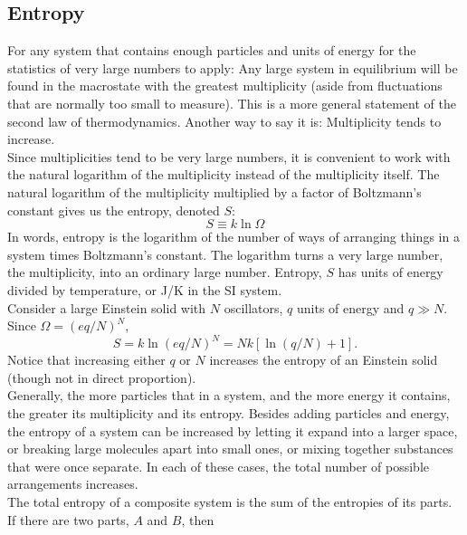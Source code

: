 \documentclass[11pt]{exam}
\begin{document}
\subsection{Entropy}
For any system that contains enough particles and units of energy for the statistics of very large numbers to apply: Any large system in equilibrium will be found in the macrostate with the greatest multiplicity (aside from fluctuations that are normally too small to measure). This is a more general statement of the second law of thermodynamics. Another way to say it is: Multiplicity tends to increase.\\
\hspace*{10mm}Since multiplicities tend to be very large numbers, it is convenient to work with the natural logarithm of the multiplicity instead of the multiplicity itself. The natural logarithm of the multiplicity multiplied by a factor of Boltzmann's constant gives us the entropy, denoted $S$:\
\begin{equation}\tag{2.45}
    S\equiv k\ln{\Omega}
\end{equation}
In words, entropy is the logarithm of the number of ways of arranging things in a system times Boltzmann's constant. The logarithm turns a very large number, the multiplicity, into an ordinary large number. Entropy, $S$ has units of energy divided by temperature, or J/K in the SI system.\\
\hspace*{10mm}Consider a large Einstein solid with $N$ oscillators, $q$ units of energy and $q\gg N$. Since $\Omega =(eq/N)^N$, 
\begin{equation}\tag{2.46}
S=k\ln{(eq/N)^N}=Nk[\ln{(q/N)}+1].    
\end{equation}
Notice that increasing either $q$ or $N$ increases the entropy of an Einstein solid (though not in direct proportion).\\
\hspace*{10mm}Generally, the more particles that in a system, and the more energy it contains, the greater its multiplicity and its entropy. Besides adding particles and energy, the entropy of a system can be increased by letting it expand into a larger space, or breaking large molecules apart into small ones, or mixing together substances that were once separate. In each of these cases, the total number of possible arrangements increases.\\
\hspace*{10mm}The total entropy of a composite system is the sum of the entropies of its parts. If there are two parts, $A$ and $B$, then 
\end{document}
